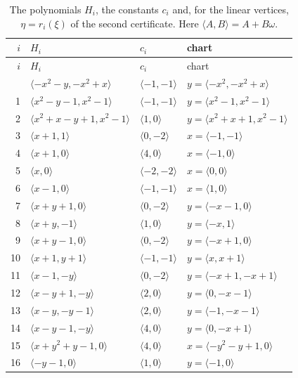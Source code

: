 \documentclass[11pt]{article}
\begin{document}
\begingroup\small
\setlength{\LTcapwidth}{\textwidth}
\begin{longtable}{@{}rlll@{}}
\caption{The polynomials $H_i$, the constants $c_i$ and, for the linear vertices, $\eta=r_i(\xi)$ of the second certificate. Here $\langle A,B\rangle=A+B\omega$.}\label{tab:vert2}\\
\hline $i$ & $H_i$ & $c_i$ & chart\\\hline\endfirsthead\hline $i$ & $H_i$ & $c_i$ & chart\\\hline\endhead\hline\endfoot
0 & $\langle -x^{2}-y,-x^{2}+x\rangle$ & $\langle -1,-1\rangle$ & $y=\langle -x^{2},-x^{2}+x\rangle$\\
1 & $\langle x^{2}-y-1,x^{2}-1\rangle$ & $\langle -1,-1\rangle$ & $y=\langle x^{2}-1,x^{2}-1\rangle$\\
2 & $\langle x^{2}+x-y+1,x^{2}-1\rangle$ & $\langle 1,0\rangle$ & $y=\langle x^{2}+x+1,x^{2}-1\rangle$\\
3 & $\langle x+1,1\rangle$ & $\langle 0,-2\rangle$ & $x=\langle -1,-1\rangle$\\
4 & $\langle x+1,0\rangle$ & $\langle 4,0\rangle$ & $x=\langle -1,0\rangle$\\
5 & $\langle x,0\rangle$ & $\langle -2,-2\rangle$ & $x=\langle 0,0\rangle$\\
6 & $\langle x-1,0\rangle$ & $\langle -1,-1\rangle$ & $x=\langle 1,0\rangle$\\
7 & $\langle x+y+1,0\rangle$ & $\langle 0,-2\rangle$ & $y=\langle -x-1,0\rangle$\\
8 & $\langle x+y,-1\rangle$ & $\langle 1,0\rangle$ & $y=\langle -x,1\rangle$\\
9 & $\langle x+y-1,0\rangle$ & $\langle 0,-2\rangle$ & $y=\langle -x+1,0\rangle$\\
10 & $\langle x+1,y+1\rangle$ & $\langle -1,-1\rangle$ & $y=\langle x,x+1\rangle$\\
11 & $\langle x-1,-y\rangle$ & $\langle 0,-2\rangle$ & $y=\langle -x+1,-x+1\rangle$\\
12 & $\langle x-y+1,-y\rangle$ & $\langle 2,0\rangle$ & $y=\langle 0,-x-1\rangle$\\
13 & $\langle x-y,-y-1\rangle$ & $\langle 2,0\rangle$ & $y=\langle -1,-x-1\rangle$\\
14 & $\langle x-y-1,-y\rangle$ & $\langle 4,0\rangle$ & $y=\langle 0,-x+1\rangle$\\
15 & $\langle x+y^{2}+y-1,0\rangle$ & $\langle 4,0\rangle$ & $x=\langle -y^{2}-y+1,0\rangle$\\
16 & $\langle -y-1,0\rangle$ & $\langle 1,0\rangle$ & $y=\langle -1,0\rangle$\\

\end{longtable}
\end{document}
